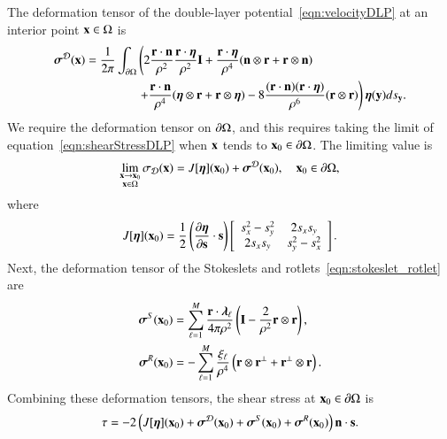 \documentclass[preprint, 10pt]{elsarticle}
\begin{document}
The deformation tensor of the double-layer
potential~\eqref{eqn:velocityDLP} at an interior point ${\mathbf{x}} \in \Omega$
is~\cite{qua-bir2014a}
\begin{equation}
  \label{eqn:shearStressDLP}
  \begin{aligned}
  {\boldsymbol\sigma}^{\mathcal{D}}({\mathbf{x}}) = \frac{1}{2\pi}\int_{{\partial}\Omega} &\left(
    2\frac{{\mathbf{r}} \cdot {\mathbf{n}}}{\rho^2} \frac{{\mathbf{r}} \cdot {\boldsymbol\eta}}{\rho^2} {\mathbf{I}} + 
    \frac{{\mathbf{r}} \cdot {\boldsymbol\eta}}{\rho^4} ({\mathbf{n}} \otimes {\mathbf{r}} + {\mathbf{r}} \otimes {\mathbf{n}}) 
    \right. \\
    &\left.
    +\frac{{\mathbf{r}} \cdot {\mathbf{n}}}{\rho^4} ({\boldsymbol\eta} \otimes {\mathbf{r}} + {\mathbf{r}} \otimes {\boldsymbol\eta}) - 
    8\frac{({\mathbf{r}} \cdot {\mathbf{n}})({\mathbf{r}} \cdot {\boldsymbol\eta})}{\rho^6}({\mathbf{r}} \otimes {\mathbf{r}})
  \right) {\boldsymbol\eta}({\mathbf{y}}) ds_{\mathbf{y}}.
  \end{aligned}
\end{equation}
We require the deformation tensor on ${\partial}\Omega$, and this requires
taking the limit of equation~\eqref{eqn:shearStressDLP} when ${\mathbf{x}}$ tends
to ${\mathbf{x}}_0 \in {\partial}\Omega$.  The limiting value is
\begin{align*}
  \lim_{\substack{{\mathbf{x}} \rightarrow {\mathbf{x}}_0 \\ {\mathbf{x}} \in \Omega}}\sigma_{\mathcal{D}}({\mathbf{x}}) =
  J[{\boldsymbol\eta}]({\mathbf{x}}_0) + {\boldsymbol\sigma}^{\mathcal{D}}({\mathbf{x}}_0), \quad {\mathbf{x}}_0 \in {\partial}\Omega,
\end{align*} 
where
\begin{align}
  J[{\boldsymbol\eta}]({\mathbf{x}}_0) = \frac{1}{2}\left(\frac{\partial {\boldsymbol\eta}}{\partial {\mathbf{s}}} 
    \cdot {\mathbf{s}}\right) \left[ 
  \begin{array}{cc}
    s_x^2 - s_y^2 & 2s_x s_y \\ 2s_x s_y & s_y^2 - s_x^2
  \end{array}\right].
  \label{eqn:shearStressJump}
\end{align}
Next, the deformation tensor of the Stokeslets and
rotlets~\eqref{eqn:stokeslet_rotlet} are
\begin{equation}
  \label{eqn:shearStressSR}
  \begin{aligned}
  {\boldsymbol\sigma}^S({\mathbf{x}}_0) &= \sum_{\ell=1}^{M}
    \frac{{\mathbf{r}} \cdot {\boldsymbol\lambda}_\ell}{4\pi\rho^2} \left(
    {\mathbf{I}} - \frac{2}{\rho^2} {\mathbf{r}} \otimes {\mathbf{r}} \right),  \\
  {\boldsymbol\sigma}^R({\mathbf{x}}_0) &= -\sum_{\ell=1}^M
    \frac{\xi_\ell}{\rho^4} \left({\mathbf{r}} \otimes {\mathbf{r}}^\perp + 
    {\mathbf{r}}^\perp \otimes {\mathbf{r}} \right).
  \end{aligned}
\end{equation}
Combining these deformation tensors, the shear stress at ${\mathbf{x}}_0 \in
{\partial}\Omega$ is
\begin{align}
  \tau = -2 \left(J[{\boldsymbol\eta}]({\mathbf{x}}_0) + {\boldsymbol\sigma}^{\mathcal{D}}({\mathbf{x}}_0) + 
    {\boldsymbol\sigma}^S({\mathbf{x}}_0) + {\boldsymbol\sigma}^R({\mathbf{x}}_0)\right) {\mathbf{n}} \cdot {\mathbf{s}}.
  \label{eqn:shearStressLP}
\end{align}
\end{document}
